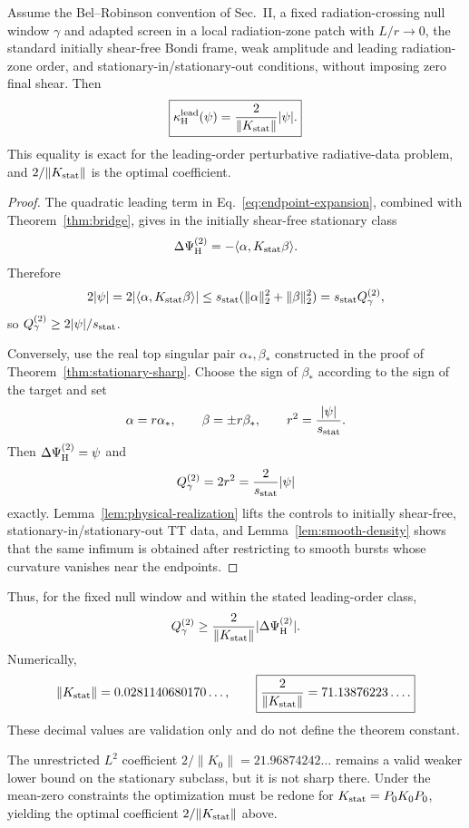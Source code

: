 \begin{theorem}
\label{thm:main-physical}
Assume the Bel--Robinson convention of Sec.~II, a fixed radiation-crossing null window $\gamma$ and adapted screen in a local radiation-zone patch with $L/r\to0$, the standard initially shear-free Bondi frame, weak amplitude and leading radiation-zone order, and stationary-in/stationary-out conditions, without imposing zero final shear. Then
\begin{equation}
\boxed{\kappa_{\rm H}^{\rm lead}(\psi)=\frac{2}{\|K_{\rm stat}\|}|\psi|.}
\label{eq:main-physical-value}
\end{equation}
This equality is exact for the leading-order perturbative radiative-data problem, and $2/\|K_{\rm stat}\|$ is the optimal coefficient.
\end{theorem}
\begin{proof}
The quadratic leading term in Eq.~\eqref{eq:endpoint-expansion}, combined with Theorem~\ref{thm:bridge}, gives in the initially shear-free stationary class
\[
\Delta\Psi_{\rm H}^{(2)}=-\langle\alpha,K_{\rm stat}\beta\rangle.
\]
Therefore
\[
2|\psi|=2|\langle\alpha,K_{\rm stat}\beta\rangle|
\le s_{\rm stat}(\|\alpha\|_2^2+\|\beta\|_2^2)
=s_{\rm stat}Q_\gamma^{(2)},
\]
so $Q_\gamma^{(2)}\ge2|\psi|/s_{\rm stat}$.

Conversely, use the real top singular pair $\alpha_*,\beta_*$ constructed in the proof of Theorem~\ref{thm:stationary-sharp}. Choose the sign of $\beta_*$ according to the sign of the target and set
\[
\alpha=r\alpha_*,\qquad \beta=\pm r\beta_*,\qquad
r^2=\frac{|\psi|}{s_{\rm stat}}.
\]
Then $\Delta\Psi_{\rm H}^{(2)}=\psi$ and
\[
Q_\gamma^{(2)}=2r^2=\frac{2}{s_{\rm stat}}|\psi|
\]
exactly. Lemma~\ref{lem:physical-realization} lifts the controls to initially shear-free, stationary-in/stationary-out TT data, and Lemma~\ref{lem:smooth-density} shows that the same infimum is obtained after restricting to smooth bursts whose curvature vanishes near the endpoints.
\end{proof}

Thus, for the fixed null window and within the stated leading-order class,
\begin{equation}
Q_\gamma^{(2)}\ge\frac{2}{\|K_{\rm stat}\|}|\Delta\Psi_{\rm H}^{(2)}|.
\label{eq:main-bound}
\end{equation}
Numerically,
\begin{equation}
\|K_{\rm stat}\|=0.0281140680170\ldots,
\qquad
\boxed{\frac{2}{\|K_{\rm stat}\|}=71.13876223\ldots.}
\label{eq:main-bound-num}
\end{equation}
These decimal values are validation only and do not define the theorem constant.

\begin{remark}
The unrestricted $L^2$ coefficient $2/\|K_0\|=21.96874242\ldots$ remains a valid weaker lower bound on the stationary subclass, but it is not sharp there. Under the mean-zero constraints the optimization must be redone for $K_{\rm stat}=P_0K_0P_0$, yielding the optimal coefficient $2/\|K_{\rm stat}\|$ above.
\end{remark}